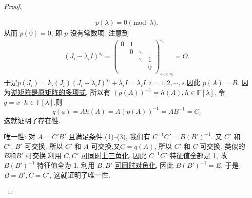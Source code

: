 \documentclass[../../main.tex]{subfiles}
\begin{document}
\begin{proof}
\begin{enumerate}
\begin{gather*}
p(\lambda) = 0 \pmod{\lambda}.
\end{gather*}
从而  \( p(0) = 0 \), 即 \( p \) 没有常数项.
注意到
\begin{align*}
\left( J_i-\lambda _iI \right) ^{s_i}=\left( \begin{matrix}
0&		1&		&		\\
&		0&		\ddots&		\\
&		&		\ddots&		1\\
&		&		&		0\\
\end{matrix} \right) _{s_i\times s_i}^{s_i}=O.
\end{align*}
于是$p(J_i)=k_i\left( J_i \right) \left( J_i-\lambda _iI \right) ^{s_i}+\lambda _iI=\lambda _iI,i=1,2,\cdots ,s.$因此 \( p(A) = B.\)
因为\hyperref[proposition:矩阵的逆可以用其多项式表示]{逆矩阵是原矩阵的多项式}, 所以有 \( (p(A))^{-1} = h(A), h \in \mathbb{F}[\lambda] \). 令 \( q = x \cdot h \in \mathbb{F}[\lambda] \),则
$$
q(a)=Ah(A)=A(p(A))^{-1}=AB^{-1}=C.
$$
这就证明了存在性.

{\heiti 唯一性:} 对 \( A = C'B' \) 且满足条件 (1)--(3), 我们有 \( C^{-1}C' = B(B')^{-1} \). 又 \( C' \) 和 \( C' \), \( B' \) 可交换, 所以 \( C' \) 和 \( A \) 可交换,又$C=q(A)$, 所以 \( C' \) 和 \( C \) 可交换. 类似的 \( B\)和\( B' \) 可交换.利用 \( C, C' \) \hyperref[proposition:一族两两可交换的一般域上的矩阵可同时上三角化]{可同时上三角化}, 因此 \( C^{-1}C' \) 特征值全部是 1, 故 \( B(B')^{-1} \) 特征值全为 1. 利用 \( B, B' \) \hyperref[proposition:一族两两可交换的可对角化矩阵可同时相似对角化]{可同时对角化}, 因此 \( B(B')^{-1} = E \), 于是 \( B = B', C = C' \), 这就证明了唯一性.
\end{enumerate}
\end{proof}
\end{document}

